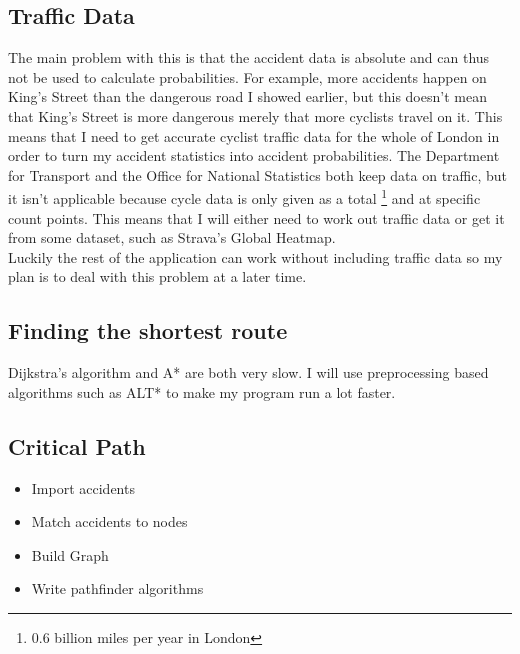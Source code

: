 \documentclass[11pt,twoside,a4paper]{article}
\begin{document}
\subsection{Traffic Data}
The main problem with this is that the accident data is absolute and can thus not be used to calculate probabilities. For example, more accidents happen on King's Street than the dangerous road I showed earlier, but this doesn't mean that King's Street is more dangerous merely that more cyclists travel on it. This means that I need to get accurate cyclist traffic data for the whole of London in order to turn my accident statistics into accident probabilities.
The Department for Transport and the Office for National Statistics both keep data on traffic, but it isn't applicable because cycle data is only given as a total \footnote{0.6 billion miles per year in London} and at specific count points.
This means that I will either need to work out traffic data or get it from some dataset, such as Strava's Global Heatmap. \\
Luckily the rest of the application can work without including traffic data so my plan is to deal with this problem at a later time.  \label{end}
\subsection{Finding the shortest route}
Dijkstra's algorithm and A* are both very slow. I will use preprocessing based algorithms such as ALT* to make my program run a lot faster.
\subsection{Critical Path}
\begin{itemize}
    \item Import accidents
    \item Match accidents to nodes
    \item Build Graph
    \item Write pathfinder algorithms
\end{itemize}
\end{document}

